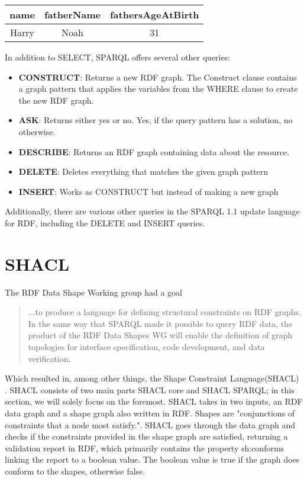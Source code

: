 \para
\begin{tabular}{@{}ccc@{}}
    \toprule
    name & fatherName & fathersAgeAtBirth \\ \midrule
    Harry & Noah & 31\\\bottomrule
\end{tabular}



\para
In addition to SELECT, SPARQL offers several other queries:
\begin{itemize}
    \item \textbf{CONSTRUCT}: Returns a new RDF graph. The Construct clause contains a graph pattern that applies the variables from the WHERE clause to create the new RDF graph. 
    \item \textbf{ASK}: Returns either yes or no. Yes, if the query pattern has a solution, no otherwise. 
    \item \textbf{DESCRIBE}: Returns an RDF graph containing data about the resource. 
    \item \textbf{DELETE}: Deletes everything that matches the given graph pattern 
    \item \textbf{INSERT}: Works as CONSTRUCT but instead of making a new graph
\end{itemize}
Additionally, there are various other queries in the SPARQL 1.1 update language for RDF\cite{SPARQL1.1Update}, including the DELETE and INSERT queries.  

\section{SHACL}

The RDF Data Shape Working group had a goal
\begin{quotation}
    ...to produce a language for defining structural constraints on RDF graphs. In the same way that SPARQL made it possible to query RDF data, the product of the RDF Data Shapes WG will enable the definition of graph topologies for interface specification, code development, and data verification.\autocite{Shape_working_group}
\end{quotation}
Which resulted in, among other things, the Shape Constraint Language(SHACL)\autocite{SHACL} . SHACL consists of two main parts SHACL core and SHACL SPARQL; in this section, we will solely focus on the foremost. SHACL takes in two inputs, an RDF data graph and a shape graph also written in RDF. Shapes are "conjunctions of constraints that a node most satisfy."\autocite[FIND PAGE]{SHACL_BOOK}. SHACL goes through the data graph and checks if the constraints provided in the shape graph are satisfied, returning a validation report in RDF, which primarily contains the property sh:conforms linking the report to a boolean value. The boolean value is true if the graph does conform to the shapes, otherwise false. 

